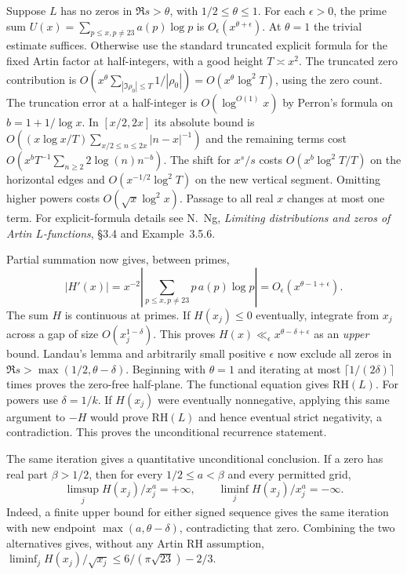 Suppose $L$ has no zeros in $\Re s>\theta$, with $1/2\le\theta\le1$.
For each $\epsilon>0$, the prime sum $U(x)=\sum_{p\le x,p\ne23}a(p)\log p$
is $O_\epsilon(x^{\theta+\epsilon})$.
At $\theta=1$ the trivial estimate suffices. Otherwise use the standard
truncated explicit formula for the fixed Artin factor at half-integers,
with a good height $T\asymp x^2$. The truncated zero contribution is
$O(x^\theta\sum_{|\Im\rho_0|\le T}1/|\rho_0|)
=O(x^\theta\log^2 T)$, using the zero count.
The truncation error at a half-integer is $O(\log^{O(1)}x)$ by Perron's
formula on $b=1+1/\log x$. In $[x/2,2x]$ its absolute bound is
$O((x\log x/T)\sum_{x/2\le n\le2x}|n-x|^{-1})$ and the remaining
terms cost $O(x^b T^{-1}\sum_{n\ge2}2\log(n)n^{-b})$.
The shift for $x^s/s$ costs $O(x^b\log^2 T/T)$ on the horizontal
edges and $O(x^{-1/2}\log^2 T)$ on the new vertical segment.
Omitting higher powers costs
$O(\sqrt{x}\log^2 x)$. Passage to all real $x$ changes at most one term.
For explicit-formula details see N.~Ng, \emph{Limiting distributions and
zeros of Artin $L$-functions}, \S3.4 and Example~3.5.6.

Partial summation now gives, between primes,
\[
 |H'(x)|=x^{-2}\left|\sum_{p\le x,p\ne23}p\,a(p)\log p\right|
   =O_\epsilon(x^{\theta-1+\epsilon}).
\]
The sum $H$ is continuous at primes. If $H(x_j)\le0$ eventually,
integrate from $x_j$ across a gap of size $O(x_j^{1-\delta})$.
This proves $H(x)\ll_\epsilon x^{\theta-\delta+\epsilon}$ as an
\emph{upper} bound. Landau's lemma and arbitrarily small positive
$\epsilon$ now exclude all zeros in
$\Re s>\max(1/2,\theta-\delta)$.
Beginning with $\theta=1$ and iterating at most
$\lceil1/(2\delta)\rceil$ times proves the zero-free half-plane.
The functional equation gives $\mathrm{RH}(L)$. For powers use $\delta=1/k$.
If $H(x_j)$ were eventually nonnegative, applying this same argument
to $-H$ would prove $\mathrm{RH}(L)$ and hence eventual strict negativity,
a contradiction. This proves the unconditional recurrence statement.

The same iteration gives a quantitative unconditional conclusion. If a zero
has real part $\beta>1/2$, then for every $1/2\le a<\beta$ and every
permitted grid,
\[
 \limsup_j H(x_j)/x_j^a=+\infty,\qquad
 \liminf_j H(x_j)/x_j^a=-\infty .
\]
Indeed, a finite upper bound for either signed sequence gives the same
iteration with new endpoint $\max(a,\theta-\delta)$, contradicting that
zero. Combining the two alternatives gives, without any Artin RH assumption,
$\liminf_j H(x_j)/\sqrt{x_j}\le 6/(\pi\sqrt{23})-2/3$.

